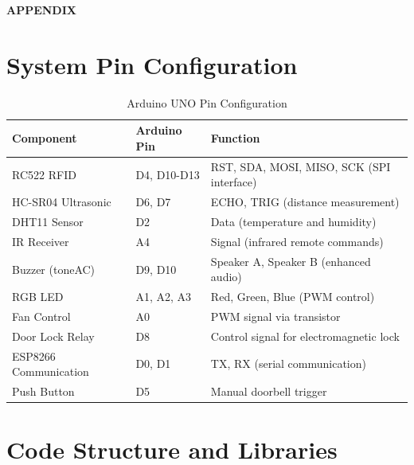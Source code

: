 \documentclass[12pt,a4paper]{report}
\begin{document}
\newpage

\appendix

{\fontsize{14}{16.8}\selectfont\bfseries\centering APPENDIX\par}
\vspace{10pt}

\section*{System Pin Configuration}
\begin{table}[H]
\centering
\caption{Arduino UNO Pin Configuration}
\label{tab:pin-config}
\begin{tabular}{|p{3cm}|p{3cm}|p{7cm}|}
\hline
\textbf{Component} & \textbf{Arduino Pin} & \textbf{Function} \\
\hline
RC522 RFID & D4, D10-D13 & RST, SDA, MOSI, MISO, SCK (SPI interface) \\
\hline
HC-SR04 Ultrasonic & D6, D7 & ECHO, TRIG (distance measurement) \\
\hline
DHT11 Sensor & D2 & Data (temperature and humidity) \\
\hline
IR Receiver & A4 & Signal (infrared remote commands) \\
\hline
Buzzer (toneAC) & D9, D10 & Speaker A, Speaker B (enhanced audio) \\
\hline
RGB LED & A1, A2, A3 & Red, Green, Blue (PWM control) \\
\hline
Fan Control & A0 & PWM signal via transistor \\
\hline
Door Lock Relay & D8 & Control signal for electromagnetic lock \\
\hline
ESP8266 Communication & D0, D1 & TX, RX (serial communication) \\
\hline
Push Button & D5 & Manual doorbell trigger \\
\hline
\end{tabular}
\end{table}

\section*{Code Structure and Libraries}
\end{document}
